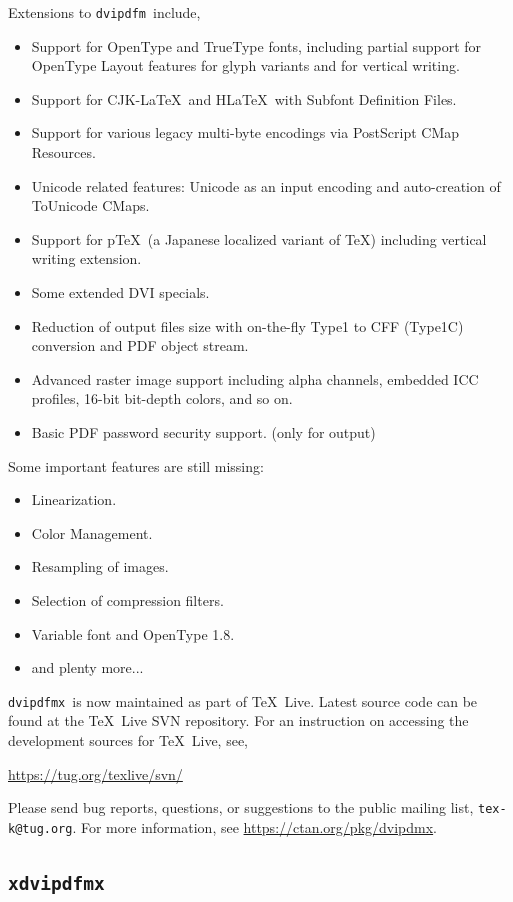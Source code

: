 \documentclass[a4paper,xetex,11pt]{report}
\newcommand{\dvipdfm}{\texttt{dvipdfm}}
\newcommand{\dvipdfmx}{\texttt{dvipdfmx}}
\newcommand{\xdvipdfmx}{\texttt{xdvipdfmx}}
\begin{document}
Extensions to \dvipdfm\ include,
\begin{itemize}
    \item Support for OpenType and TrueType fonts, including partial support
    for OpenType Layout features for glyph variants and for vertical writing.
    \item Support for CJK-\LaTeX\ and H\LaTeX\ with Subfont Definition Files.
    \item Support for various legacy multi-byte encodings via PostScript CMap
     Resources.
    \item Unicode related features: Unicode as an input encoding and
    auto-creation of ToUnicode CMaps.
    \item Support for p\TeX\ (a Japanese localized variant of \TeX) including
    vertical writing extension.
    \item Some extended DVI specials.
    \item Reduction of output files size with on-the-fly Type1 to CFF (Type1C)
    conversion and PDF object stream.
    \item Advanced raster image support including alpha channels, embedded
    ICC profiles, 16-bit bit-depth colors, and so on.
    \item Basic PDF password security support. (only for output)
\end{itemize}
Some important features are still missing:
\begin{itemize}
    \item Linearization.
    \item Color Management.
    \item Resampling of images.
    \item Selection of compression filters.
    \item Variable font and OpenType 1.8.
    \item and plenty more...
\end{itemize}

\dvipdfmx\ is now maintained as part of \TeX\ Live. Latest source code can
be found at the \TeX\ Live SVN repository. For an instruction on accessing the
development sources for \TeX\ Live, see,\medskip

\url{https://tug.org/texlive/svn/}
\medskip

\noindent Please send bug reports, questions, or suggestions to
the public mailing list, \texttt{tex-k@tug.org}. For more information,
see \url{https://ctan.org/pkg/dvipdmx}.

\subsection{\xdvipdfmx}
\end{document}
